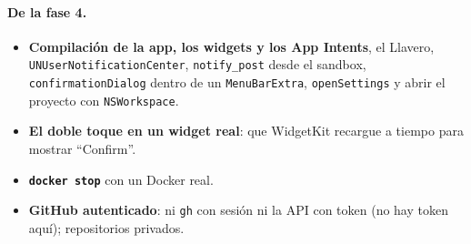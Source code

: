 \documentclass[11pt,a4paper]{article}
\begin{document}
\paragraph{De la fase 4.}
\begin{itemize}
  \item \textbf{Compilación de la app, los widgets y los App
    Intents}, el Llavero, \texttt{UNUserNotificationCenter},
    \texttt{notify\_post} desde el sandbox, \texttt{confirmationDialog}
    dentro de un \texttt{MenuBarExtra}, \texttt{openSettings} y abrir
    el proyecto con \texttt{NSWorkspace}.
  \item \textbf{El doble toque en un widget real}: que WidgetKit
    recargue a tiempo para mostrar ``Confirm''.
  \item \textbf{\texttt{docker stop}} con un Docker real.
  \item \textbf{GitHub autenticado}: ni \texttt{gh} con sesión ni la
    API con token (no hay token aquí); repositorios privados.
\end{itemize}
\end{document}
